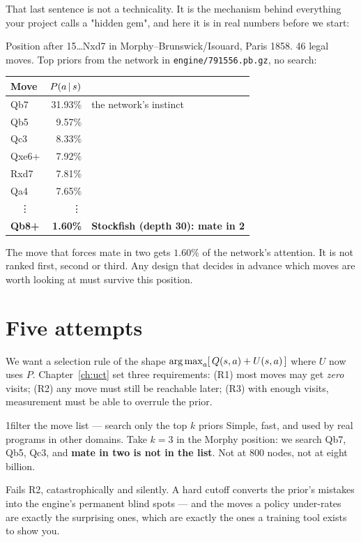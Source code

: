 That last sentence is not a technicality. It is the mechanism behind everything your project
calls a "hidden gem", and here it is in real numbers before we start:

\begin{realdata}[title={Real engine output: priors in the Morphy position, before 16.Qb8+}]
Position after 15\ldots Nxd7 in Morphy--Brunswick/Isouard, Paris 1858. 46 legal moves. Top
priors from the network in \texttt{engine/791556.pb.gz}, no search:
\begin{center}
\begin{tabular}{@{}lrl@{}}
\toprule
Move & $P(a\,|\, s)$ & \\
\midrule
Qb7   & 31.93\% & the network's instinct \\
Qb5   &  9.57\% & \\
Qc3   &  8.33\% & \\
Qxe6+ &  7.92\% & \\
Rxd7  &  7.81\% & \\
Qa4   &  7.65\% & \\
\ \ \vdots & \vdots & \\
\textbf{Qb8+} & \textbf{1.60\%} & \textbf{Stockfish (depth 30): mate in 2} \\
\bottomrule
\end{tabular}
\end{center}
The move that forces mate in two gets $1.60\%$ of the network's attention. It is not ranked
first, second or third. Any design that decides in advance which moves are worth looking at
must survive this position.
\end{realdata}

\section{Five attempts}

We want a selection rule of the shape $\operatorname*{arg\,max}_a [\,Q(s,a) + U(s,a)\,]$ where $U$ now uses
$P$. Chapter~\ref{ch:uct} set three requirements: (R1) most moves may get \emph{zero} visits;
(R2) any move must still be reachable later; (R3) with enough visits, measurement must be
able to overrule the prior.

\begin{attempt}{1}{filter the move list --- search only the top $k$ priors}
Simple, fast, and used by real programs in other domains. Take $k = 3$ in the Morphy
position: we search Qb7, Qb5, Qc3, and \textbf{mate in two is not in the list}. Not at 800
nodes, not at eight billion.

Fails R2, catastrophically and silently. A hard cutoff converts the prior's mistakes into
the engine's permanent blind spots --- and the moves a policy under-rates are exactly the
surprising ones, which are exactly the ones a training tool exists to show you.
\end{attempt}


